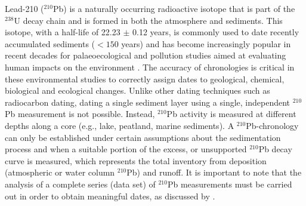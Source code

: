 \documentclass [10pt] {article}
\begin{document}
	Lead-210 ($^{210}$Pb) is a naturally occurring radioactive isotope that is part of the $^{238}$U decay chain and is formed in both the atmosphere and sediments. This isotope, with a half-life of 22.23 $\pm$ 0.12 years, is commonly used to date recently accumulated sediments ($<150$ years) and has become increasingly popular in recent decades for palaeoecological and pollution studies aimed at evaluating human impacts on the environment \citep[e.g.,][]{Courtney2019}. The accuracy of chronologies is critical in these environmental studies to correctly assign dates to geological, chemical, biological and ecological changes. Unlike other dating techniques such as radiocarbon dating, dating a single sediment layer using a single, independent $^{210}$Pb measurement is not possible. Instead, $^{210}$Pb activity is measured at different depths along a core (e.g., lake, peatland, marine sediments). A $^{210}$Pb-chronology can only be established under certain assumptions about the sedimentation process and when a suitable portion of the excess, or unsupported $^{210}$Pb decay curve is measured, which represents the total inventory from deposition (atmospheric or water column $^{210}$Pb) and runoff. It is important to note that the analysis of a complete series (data set) of $^{210}$Pb measurements must be carried out in order to obtain meaningful dates, as discussed by \citet{Aquino2018}.


\end{document}
